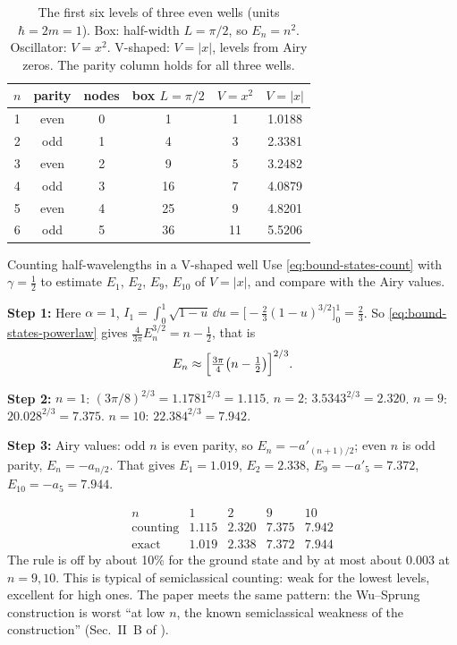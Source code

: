 \begin{table}[htbp]\centering
\caption{The first six levels of three even wells (units $\hbar=2m=1$). Box: half-width $L=\pi/2$, so $E_n=n^2$. Oscillator: $V=x^2$. V-shaped: $V=|x|$, levels from Airy zeros. The parity column holds for all three wells.}
\label{tab:bound-states-ladder}
\begin{tabular}{cccccc}
\toprule
$n$ & parity & nodes & box $L=\pi/2$ & $V=x^2$ & $V=|x|$\\
\midrule
1 & even & 0 & 1 & 1 & 1.0188\\
2 & odd  & 1 & 4 & 3 & 2.3381\\
3 & even & 2 & 9 & 5 & 3.2482\\
4 & odd  & 3 & 16 & 7 & 4.0879\\
5 & even & 4 & 25 & 9 & 4.8201\\
6 & odd  & 5 & 36 & 11 & 5.5206\\
\bottomrule
\end{tabular}
\end{table}

\begin{sample}{Counting half-wavelengths in a V-shaped well}
Use \cref{eq:bound-states-count} with $\gamma=\tfrac12$ to estimate $E_1$, $E_2$, $E_9$, $E_{10}$ of $V=|x|$, and compare with the Airy values.

\textbf{Step 1:} Here $\alpha=1$, $I_1=\int_0^1\sqrt{1-u}\,\dd u=\bigl[-\tfrac23(1-u)^{3/2}\bigr]_0^1=\tfrac23$. So \cref{eq:bound-states-powerlaw} gives $\frac{4}{3\pi}E_n^{3/2}=n-\tfrac12$, that is
\[
E_n\approx\Bigl[\tfrac{3\pi}{4}\bigl(n-\tfrac12\bigr)\Bigr]^{2/3}.
\]

\textbf{Step 2:} $n=1$: $(3\pi/8)^{2/3}=1.1781^{2/3}=1.115$. $n=2$: $3.5343^{2/3}=2.320$. $n=9$: $20.028^{2/3}=7.375$. $n=10$: $22.384^{2/3}=7.942$.

\textbf{Step 3:} Airy values: odd $n$ is even parity, so $E_n=-a'_{(n+1)/2}$; even $n$ is odd parity, $E_n=-a_{n/2}$. That gives $E_1=1.019$, $E_2=2.338$, $E_9=-a'_5=7.372$, $E_{10}=-a_5=7.944$.

\[
\boxed{\begin{array}{c|cccc} n&1&2&9&10\\\hline\text{counting}&1.115&2.320&7.375&7.942\\ \text{exact}&1.019&2.338&7.372&7.944\end{array}}
\]
The rule is off by about 10\% for the ground state and by at most about $0.003$ at $n=9,10$. This is typical of semiclassical counting: weak for the lowest levels, excellent for high ones. The paper meets the same pattern: the Wu--Sprung construction is worst ``at low $n$, the known semiclassical weakness of the construction'' (Sec.~II~B of \cite{soniR1}).
\end{sample}


